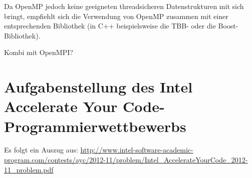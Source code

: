 \documentclass[11pt]{scrartcl}
\begin{document}
Da OpenMP jedoch keine geeigneten threadsicheren Datenstrukturen mit sich bringt, empfiehlt sich die Verwendung von OpenMP zusammen mit einer entsprechenden Bibliothek (in C++ beispielsweise die TBB- oder die Boost-Bibliothek).

Kombi mit OpenMPI?

\pagebreak %

\fancyhead[R]{}

\thispagestyle{empty}

\renewcommand*{\biburlprefix}{(URL: }
\renewcommand*{\biburlsuffix}{)}

\pagebreak
{} %


\appendix

\section{Aufgabenstellung des Intel Accelerate Your Code-Programmierwettbewerbs}

\label{intel_ayc_problem}

Es folgt ein Auszug aus:
\url{http://www.intel-software-academic-program.com/contests/ayc/2012-11/problem/Intel_AccelerateYourCode_2012-11_problem.pdf}
\end{document}
